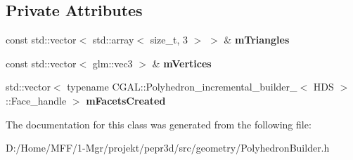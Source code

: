 \subsection*{Private Attributes}
\begin{DoxyCompactItemize}
\item 
\mbox{\label{classpepr3d_1_1_polyhedron_builder_a02210edd1e8feb52442b2b97178c52f6}} 
const std\+::vector$<$ std\+::array$<$ size\+\_\+t, 3 $>$ $>$ \& {\bfseries m\+Triangles}
\item 
\mbox{\label{classpepr3d_1_1_polyhedron_builder_adab85375d426f5864e0aae328e1d27d9}} 
const std\+::vector$<$ glm\+::vec3 $>$ \& {\bfseries m\+Vertices}
\item 
\mbox{\label{classpepr3d_1_1_polyhedron_builder_a0c79d591a3234af3fad03d8cd133e467}} 
std\+::vector$<$ typename C\+G\+A\+L\+::\+Polyhedron\+\_\+incremental\+\_\+builder\+\_$<$ H\+DS $>$\+::Face\+\_\+handle $>$ {\bfseries m\+Facets\+Created}
\end{DoxyCompactItemize}


The documentation for this class was generated from the following file\+:\begin{DoxyCompactItemize}
\item 
D\+:/\+Home/\+M\+F\+F/1-\/\+Mgr/projekt/pepr3d/src/geometry/Polyhedron\+Builder.\+h\end{DoxyCompactItemize}
